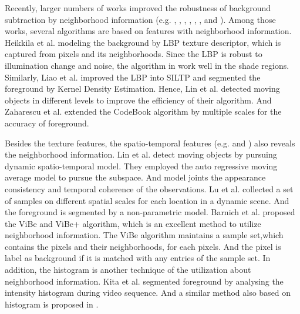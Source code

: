 \documentclass[runningheads,a4paper]{llncs}
\begin{document}
Recently, larger numbers of works improved the robustness of background
subtraction by neighborhood information (e.g. \cite{2010_CVPR_SILTP},
\cite{2014_IS_MulLevTex}, \cite{2009_ICASSP_ViBe}, \cite{2011_TIP_ViBep},
\cite{2012_CVPRW_ViBe_Van}, \cite{2006_TPAMI_TexBased},
\cite{2014_TIP_Spatio_Lin} and \cite{2011_ICCV_MultiScale_Zaharescu}).
Among those works, several algorithms are based on features with
neighborhood information.
Heikkila et al. \cite{2006_TPAMI_TexBased} modeling the background by LBP
\cite{2006_TPAMI_TexBased} texture descriptor, which is captured from pixels
and its neighborhoods.
Since the LBP is robust to illumination change and noise, the algorithm
in \cite{2006_TPAMI_TexBased} work well in the shade regions.
Similarly, Liao et al. \cite{2010_CVPR_SILTP} improved the LBP into SILTP and
segmented the foreground by Kernel Density Estimation.
Hence, Lin et al. \cite{2014_IS_MulLevTex} detected moving objects in different levels
to improve the efficiency of their algorithm.
And Zaharescu et al. \cite{2011_ICCV_MultiScale_Zaharescu} extended the
CodeBook algorithm by multiple scales for the accuracy of
foreground.

Besides the texture features, the spatio-temporal features (e.g.
\cite{2014_TIP_Spatio_Lin} and \cite{2014_ICIP_MultiScaleSpatio_Lu}) also
reveals the neighborhood information.
Lin et al. \cite{2014_TIP_Spatio_Lin} detect moving objects by pursuing dynamic
spatio-temporal model.
They employed the auto regressive moving average model
to pursue the subspace. And model joints the appearance consistency and temporal
coherence of the observations.
Lu et al. \cite{2014_ICIP_MultiScaleSpatio_Lu} collected a set of samples on
different spatial scales for each location in a dynamic scene. And the
foreground is segmented by a non-parametric model.
Barnich et al. proposed the ViBe \cite{2009_ICASSP_ViBe} and ViBe+
\cite{2011_TIP_ViBep} algorithm, which is an excellent method to utilize
neighborhood information.
The ViBe algorithm maintains a sample set,which contains
the pixels and their neighborhoods, for each pixels.
And the pixel is label as background if it is matched with
any entries of the sample set.
In addition, the histogram is another technique of the
utilization about neighborhood information.
Kita et al. \cite{2010_ICPR_KitaHis} segmented foreground by analysing the
intensity histogram during video sequence. And a similar method also based on
histogram is proposed in \cite{2009_ICIC_KuoHis}.
\end{document}

